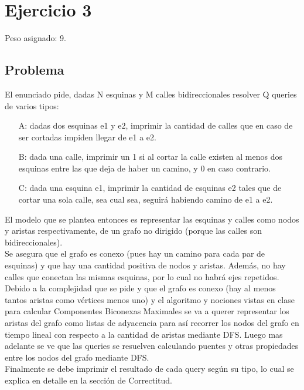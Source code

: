 \section{Ejercicio 3}

Peso asignado: 9.

\subsection{Problema}

El enunciado pide, dadas N esquinas y M calles bidireccionales resolver Q queries de varios tipos:
\begin{itemize}
	\item[A: ] dadas dos esquinas e1 y e2, imprimir la cantidad de calles que en caso de ser cortadas impiden llegar de e1 a e2.
	\item[B: ] dada una calle, imprimir un 1 si al cortar la calle existen al menos dos esquinas entre las que deja de haber un camino, y 0 en caso contrario.
	\item[C: ] dada una esquina e1, imprimir la cantidad de esquinas e2 tales que de cortar una sola calle, sea cual sea, seguir\'a habiendo camino de e1 a e2.
\end{itemize}

El modelo que se plantea entonces es representar las esquinas y calles como nodos y aristas respectivamente, de un grafo no dirigido
(porque las calles son bidireccionales).\\

Se asegura que el grafo es conexo (pues hay un camino para cada par de esquinas) y que hay una cantidad positiva de nodos y aristas.
Además, no hay calles que conectan las mismas esquinas, por lo cual no habrá ejes repetidos. \\

Debido a la complejidad que se pide y que el grafo es conexo (hay al menos tantos aristas como vértices menos uno) y el algoritmo y nociones
vistas en clase para calcular Componentes Biconexas Maximales se va a querer representar los aristas del grafo como listas de adyacencia para as\'i 
recorrer los nodos del grafo en tiempo lineal con respecto a la cantidad de aristas mediante DFS. Luego mas adelante se ve que las queries se resuelven
calculando puentes y otras propiedades entre los nodos del grafo mediante DFS. \\

Finalmente se debe imprimir el resultado de cada query seg\'un su tipo, lo cual se explica en detalle en la sección de Correctitud. \\

